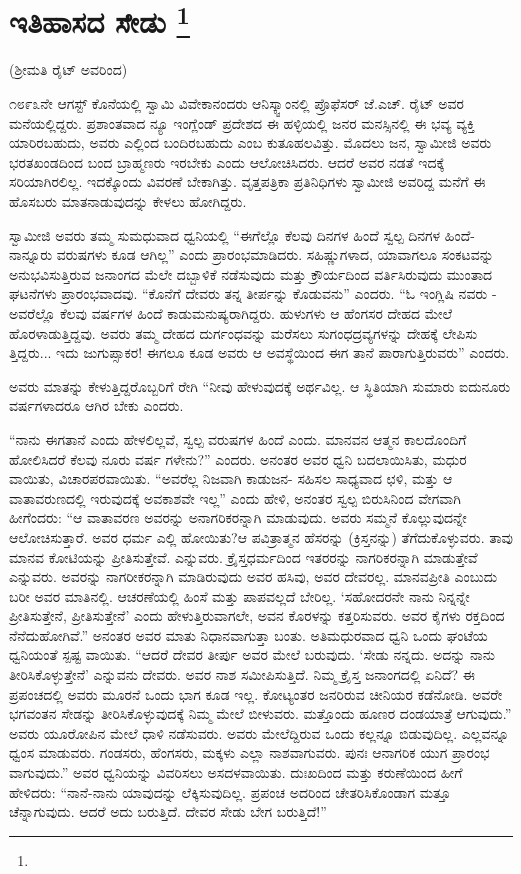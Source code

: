 
\chapter[ಇತಿಹಾಸದ ಸೇಡು ]{ಇತಿಹಾಸದ ಸೇಡು \protect\footnote{}}

\centerline{(ಶ‍್ರೀಮತಿ ರೈಟ್​ ಅವರಿಂದ)}

೧೮೯೩ನೇ ಆಗಸ್ಟ್​ ಕೊನೆಯಲ್ಲಿ ಸ್ವಾಮಿ ವಿವೇಕಾನಂದರು ಆನಿಸ್ಕ್ವಾಂನಲ್ಲಿ ಪ್ರೊಫೆಸರ್​ ಜೆ.ಎಚ್​. ರೈಟ್​ ಅವರ ಮನೆಯಲ್ಲಿದ್ದರು. ಪ್ರಶಾಂತವಾದ ನ್ಯೂ ಇಂಗ್ಲೆಂಡ್​ ಪ್ರದೇಶದ ಈ ಹಳ್ಳಿಯಲ್ಲಿ ಜನರ ಮನಸ್ಸಿನಲ್ಲಿ ಈ ಭವ್ಯ ವ್ಯಕ್ತಿ ಯಾರಿರಬಹುದು, ಅವರು ಎಲ್ಲಿಂದ ಬಂದಿರಬಹುದು ಎಂಬ ಕುತೂಹಲವಿತ್ತು. ಮೊದಲು ಜನ, ಸ್ವಾಮೀಜಿ ಅವರು ಭರತಖಂಡದಿಂದ ಬಂದ ಬ್ರಾಹ್ಮಣರು ಇರಬೇಕು ಎಂದು ಆಲೋಚಿಸಿದರು. ಆದರೆ ಅವರ ನಡತೆ ಇದಕ್ಕೆ ಸರಿಯಾಗಿರಲಿಲ್ಲ. ಇದಕ್ಕೊಂದು ವಿವರಣೆ ಬೇಕಾಗಿತ್ತು. ವೃತ್ತಪತ್ರಿಕಾ ಪ್ರತಿನಿಧಿಗಳು ಸ್ವಾಮೀಜಿ ಅವರಿದ್ದ ಮನೆಗೆ ಈ ಹೊಸಬರು ಮಾತನಾಡುವುದನ್ನು ಕೇಳಲು ಹೋಗಿದ್ದರು.

ಸ್ವಾಮೀಜಿ ಅವರು ತಮ್ಮ ಸುಮಧುವಾದ ಧ್ವನಿಯಲ್ಲಿ “ಈಗೆಲ್ಲೊ ಕೆಲವು ದಿನಗಳ ಹಿಂದೆ ಸ್ವಲ್ಪ ದಿನಗಳ ಹಿಂದೆ-ನಾನ್ನೂರು ವರುಷಗಳು ಕೂಡ ಆಗಿಲ್ಲ” ಎಂದು ಪ್ರಾರಂಭಮಾಡಿದರು. ಸಹಿಷ್ಣುಗಳಾದ, ಯಾವಾಗಲೂ ಸಂಕಟವನ್ನು ಅನುಭವಿಸುತ್ತಿರುವ ಜನಾಂಗದ ಮೆಲೇ ದಬ್ಬಾಳಿಕೆ ನಡೆಸುವುದು ಮತ್ತು ಕ್ರೌರ್ಯದಿಂದ ವರ್ತಿಸಿರುವುದು ಮುಂತಾದ ಘಟನೆಗಳು ಪ್ರಾರಂಭವಾದವು. “ಕೊನೆಗೆ ದೇವರು ತನ್ನ ತೀರ್ಪನ್ನು ಕೊಡುವನು” ಎಂದರು. “ಓ ಇಂಗ್ಲಿಷಿ ನವರು - ಅವರೆಲ್ಲೊ ಕೆಲವು ವರ್ಷಗಳ ಹಿಂದೆ ಕಾಡುಮನುಷ್ಯರಾಗಿದ್ದರು. ಹುಳುಗಳು ಆ ಹೆಂಗಸರ ದೇಹದ ಮೇಲೆ ಹೊರಳಾಡುತ್ತಿದ್ದವು. ಅವರು ತಮ್ಮ ದೇಹದ ದುರ್ಗಂಧವನ್ನು ಮರೆಸಲು ಸುಗಂಧದ್ರವ್ಯಗಳನ್ನು ದೇಹಕ್ಕೆ ಲೇಪಿಸು ತ್ತಿದ್ದರು... ಇದು ಜುಗುಪ್ಸಾಕರ! ಈಗಲೂ ಕೂಡ ಅವರು ಆ ಅವಸ್ಥೆಯಿಂದ ಈಗ ತಾನೆ ಪಾರಾಗುತ್ತಿರುವರು” ಎಂದರು.

ಅವರು ಮಾತನ್ನು ಕೇಳುತ್ತಿದ್ದರೊಬ್ಬರಿಗೆ ರೇಗಿ “ನೀವು ಹೇಳುವುದಕ್ಕೆ ಅರ್ಥವಿಲ್ಲ. ಆ ಸ್ಥಿತಿಯಾಗಿ ಸುಮಾರು ಐದುನೂರು ವರ್ಷಗಳಾದರೂ ಆಗಿರ ಬೇಕು ಎಂದರು.

“ನಾನು ಈಗತಾನೆ ಎಂದು ಹೇಳಲಿಲ್ಲವೆ, ಸ್ವಲ್ಪ ವರುಷಗಳ ಹಿಂದೆ ಎಂದು. ಮಾನವನ ಆತ್ಮನ ಕಾಲದೊಂದಿಗೆ ಹೋಲಿಸಿದರೆ ಕೆಲವು ನೂರು ವರ್ಷ ಗಳೇನು?” ಎಂದರು. ಅನಂತರ ಅವರ ಧ್ವನಿ ಬದಲಾಯಿಸಿತು, ಮಧುರ ವಾಯಿತು, ವಿಚಾರಪರವಾಯಿತು. “ಅವರೆಲ್ಲ ನಿಜವಾಗಿ ಕಾಡುಜನ- ಸಹಿಸಲ ಸಾಧ್ಯವಾದ ಛಳಿ, ಮತ್ತು ಆ ವಾತಾವರುಣದಲ್ಲಿ ಇರುವುದಕ್ಕೆ ಅವಕಾಶವೇ ಇಲ್ಲ” ಎಂದು ಹೇಳಿ, ಅನಂತರ ಸ್ವಲ್ಪ ಬಿರುಸಿನಿಂದ ವೇಗವಾಗಿ ಹೀಗೆಂದರು: “ಆ ವಾತಾವರಣ ಅವರನ್ನು ಅನಾಗರಿಕರನ್ನಾಗಿ ಮಾಡುವುದು. ಅವರು ಸಮ್ಮನೆ ಕೊಲ್ಲುವುದನ್ನೇ ಆಲೋಚಿಸುತ್ತಾರೆ. ಅವರ ಧರ್ಮ ಎಲ್ಲಿ ಹೋಯಿತು?ಆ ಪವಿತ್ರಾತ್ಮನ ಹೆಸರನ್ನು (ಕ್ರಿಸ್ತನನ್ನು) ತೆಗೆದುಕೊಳ್ಳುವರು. ತಾವು ಮಾನವ ಕೋಟಿಯನ್ನು ಪ್ರೀತಿಸುತ್ತೇವೆ. ಎನ್ನುವರು. ಕ್ರೈಸ್ತಧರ್ಮದಿಂದ ಇತರರನ್ನು ನಾಗರಿಕರನ್ನಾಗಿ ಮಾಡುತ್ತೇವೆ ಎನ್ನುವರು. ಅವರನ್ನು ನಾಗರೀಕರನ್ನಾಗಿ ಮಾಡಿರುವುದು ಅವರ ಹಸಿವು, ಅವರ ದೇವರಲ್ಲ. ಮಾನವಪ್ರೀತಿ ಎಂಬುದು ಬರೀ ಅವರ ಮಾತಿನಲ್ಲಿ. ಆಚರಣೆಯಲ್ಲಿ ಹಿಂಸೆ ಮತ್ತು ಪಾಪವಲ್ಲದೆ ಬೇರಿಲ್ಲ. ‘ಸಹೋದರನೇ ನಾನು ನಿನ್ನನ್ನೇ ಪ್ರೀತಿಸುತ್ತೇನೆ, ಪ್ರೀತಿಸುತ್ತೇನೆ’ ಎಂದು ಹೇಳುತ್ತಿರುವಾಗಲೇ, ಅವನ ಕೊರಳನ್ನು ಕತ್ತರಿಸುವರು. ಅವರ ಕೈಗಳು ರಕ್ತದಿಂದ ನೆನೆದುಹೋಗಿವೆ.” ಅನಂತರ ಅವರ ಮಾತು ನಿಧಾನವಾಗುತ್ತಾ ಬಂತು. ಅತಿಮಧುರವಾದ ಧ್ವನಿ ಒಂದು ಘಂಟೆಯ ಧ್ವನಿಯಂತೆ ಸ್ಪಷ್ಟ ವಾಯಿತು. “ಆದರೆ ದೇವರ ತೀರ್ಪು ಅವರ ಮೇಲೆ ಬರುವುದು. ‘ಸೇಡು ನನ್ನದು. ಅದನ್ನು ನಾನು ತೀರಿಸಿಕೊಳ್ಳುತ್ತೇನೆ’ ಎನ್ನುವನು ದೇವರು. ಅವರ ನಾಶ ಸಮೀಪಿಸುತ್ತಿದೆ. ನಿಮ್ಮ ಕ್ರೈಸ್ತ ಜನಾಂಗದಲ್ಲಿ ಏನಿದೆ? ಈ ಪ್ರಪಂಚದಲ್ಲಿ ಅವರು ಮೂರನೆ ಒಂದು ಭಾಗ ಕೂಡ ಇಲ್ಲ. ಕೋಟ್ಯಂತರ ಜನರಿರುವ ಚೀನಿಯರ ಕಡೆನೋಡಿ. ಅವರೇ ಭಗವಂತನ ಸೇಡನ್ನು ತೀರಿಸಿಕೊಳ್ಳುವುದಕ್ಕೆ ನಿಮ್ಮ ಮೇಲೆ ಬೀಳುವರು. ಮತ್ತೊಂದು ಹೂಣರ ದಂಡಯಾತ್ರೆ ಆಗುವುದು.” ಅವರು ಯೂರೋಪಿನ ಮೇಲೆ ಧಾಳಿ ನಡೆಸುವರು. ಅವರು ಮೇಲೆದ್ದಿರುವ ಒಂದು ಕಲ್ಲನ್ನೂ ಬಿಡುವುದಿಲ್ಲ. ಎಲ್ಲವನ್ನೂ ಧ್ವಂಸ ಮಾಡುವರು. ಗಂಡಸರು, ಹೆಂಗಸರು, ಮಕ್ಕಳು ಎಲ್ಲಾ ನಾಶವಾಗುವರು. ಪುನಃ ಆನಾಗರಿಕ ಯುಗ ಪ್ರಾರಂಭ ವಾಗುವುದು.” ಅವರ ಧ್ವನಿಯನ್ನು ವಿವರಿಸಲು ಅಸದಳವಾಯಿತು. ದುಃಖದಿಂದ ಮತ್ತು ಕರುಣೆಯಿಂದ ಹೀಗೆ ಹೇಳಿದರು: “ನಾನೆ-ನಾನು ಯಾವುದನ್ನು ಲೆಕ್ಕಿಸುವುದಿಲ್ಲ. ಪ್ರಪಂಚ ಅದರಿಂದ ಚೇತರಿಸಿಕೊಂಡಾಗ ಮತ್ತೂ ಚೆನ್ನಾಗುವುದು. ಆದರೆ ಅದು ಬರುತ್ತಿದೆ. ದೇವರ ಸೇಡು ಬೇಗ ಬರುತ್ತಿದೆ!”

